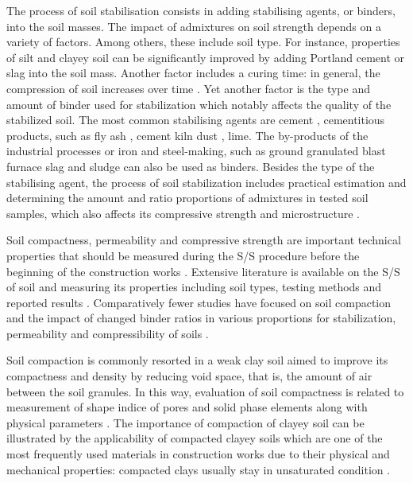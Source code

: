 \documentclass{amestyle}
\begin{document}
The process of soil stabilisation consists in adding stabilising agents, or binders, into the soil masses. The impact of admixtures on soil strength depends on a variety of factors. Among others, these include soil type. For instance, properties of silt and clayey soil can be significantly improved by adding Portland cement or slag into the soil mass. Another factor includes a curing time: in general, the compression of soil increases over time \cite{Lindh202102}. Yet another factor is the type and amount of binder used for stabilization which notably affects the quality of the stabilized soil. The most common stabilising agents are cement \cite{Rekik}, cementitious products, such as fly ash \cite{Tastan,Hasan}, cement kiln dust \cite{Solanki,Lindh2021a}, lime. The by-products of the industrial processes or iron and steel-making, such as ground granulated blast furnace slag \cite{Mozejko} and sludge \cite{Ingunza,Sharif} can also be used as binders. Besides the type of the stabilising agent, the process of soil stabilization includes practical estimation and determining the amount and ratio proportions of admixtures in tested soil samples, which also affects its compressive strength and microstructure \cite{Lindh2001,Ahmed}.

Soil compactness, permeability and compressive strength are important technical properties that should be measured during the S/S procedure before the beginning of the construction works \cite{LindhWinter,XU2021114774}. Extensive literature is available on the S/S of soil and measuring its properties including soil types, testing methods and reported results \cite{Anagnostopoulos,Kallenetal2016,Lemenkov2021a,HUANG2022115452}. Comparatively fewer studies have focused on soil compaction and the impact of changed binder ratios in various proportions for stabilization, permeability and compressibility of soils \cite{Kongkitkul,Leeetal2007}. 

Soil compaction is commonly resorted in a weak clay soil aimed to improve its compactness and density by reducing void space, that is, the amount of air between the soil granules. In this way, evaluation of soil compactness is related to measurement of shape indice of pores and solid phase elements along with physical parameters \cite{Bryk}. The importance of compaction of clayey soil can be illustrated by the applicability of compacted clayey soils which are one of the most frequently used materials in construction works due to their physical and mechanical properties: compacted clays usually stay in unsaturated condition \cite{Zou}. 
\end{document}
